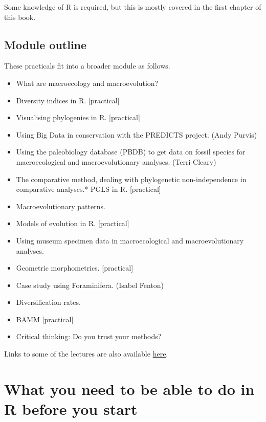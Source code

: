 \documentclass[]{book}
\providecommand{\tightlist}{%
  \setlength{\itemsep}{0pt}\setlength{\parskip}{0pt}}
\theoremstyle{definition}
\theoremstyle{definition}
\theoremstyle{definition}
\theoremstyle{remark}
\begin{document}
Some knowledge of R is required, but this is mostly covered in the first
chapter of this book.

\section{Module outline}\label{module-outline}

These practicals fit into a broader module as follows.

\begin{itemize}
\tightlist
\item
  What are macroecology and macroevolution?
\item
  Diversity indices in R. {[}practical{]}
\item
  Visualising phylogenies in R. {[}practical{]}
\item
  Using Big Data in conservation with the PREDICTS project. (Andy
  Purvis)
\item
  Using the paleobiology database (PBDB) to get data on fossil species
  for macroecological and macroevolutionary analyses. (Terri Cleary)
\item
  The comparative method, dealing with phylogenetic non-independence in
  comparative analyses.* PGLS in R. {[}practical{]}
\item
  Macroevolutionary patterns.
\item
  Models of evolution in R. {[}practical{]}
\item
  Using museum specimen data in macroecological and macroevolutionary
  analyses.
\item
  Geometric morphometrics. {[}practical{]}
\item
  Case study using Foraminifera. (Isabel Fenton)
\item
  Diversification rates.
\item
  BAMM {[}practical{]}
\item
  Critical thinking: Do you trust your methods?
\end{itemize}

Links to some of the lectures are also available
\href{https://github.com/nhcooper123/TeachingMaterials/blob/master/MSc_Museum/Lectures/Lectures_README.md}{here}.

\chapter{What you need to be able to do in R before you
start}\label{what-you-need-to-be-able-to-do-in-r-before-you-start}
\end{document}
